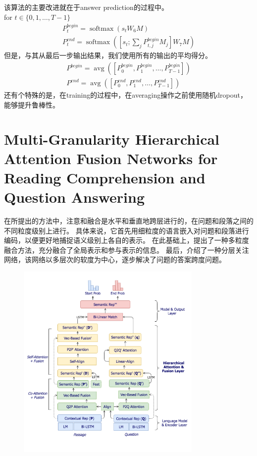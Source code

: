 \documentclass[a4paper,UTF8]{article}
\numberwithin{equation}{section}
\begin{document}
该算法的主要改进就在于answer prediction的过程中。\\
for $t \in\{0,1, \ldots, T-1\}$ \\
\begin{equation}
\begin{array}{c}{P_{t}^{b e g i n}=\operatorname{softmax}\left(s_{t} W_{6} M\right)} \\ {P_{t}^{e n d}=\operatorname{softmax}\left(\left[s_{t} ; \sum_{j} P_{t, j}^{b e g i n} M_{j}\right] W_{7} M\right)}\end{array}
\end{equation}
但是，与其从最后一步输出结果，我们使用所有的输出的平均得分。
\begin{equation}
\begin{array}{c}{P^{b e g i n}=\operatorname{avg}\left(\left[P_{0}^{b e g i n}, P_{1}^{b e g i n}, \ldots, P_{T-1}^{b e g i n}\right]\right)} \\ {P^{e n d}=\operatorname{avg}\left(\left[P_{0}^{e n d}, P_{1}^{e n d}, \ldots, P_{T-1}^{e n d}\right]\right)}\end{array}
\end{equation}
还有个特殊的是，在training的过程中，在averaging操作之前使用随机dropout，能够提升鲁棒性。 
\newpage
\section{Multi-Granularity Hierarchical Attention Fusion Networks for Reading Comprehension and Question Answering}
在所提出的方法中，注意和融合是水平和垂直地跨层进行的，在问题和段落之间的不同粒度级别上进行。
具体来说，它首先用细粒度的语言嵌入对问题和段落进行编码，以便更好地捕捉语义级别上各自的表示。
在此基础上，提出了一种多粒度融合方法，充分融合了全局表示和参与表示的信息。
最后，介绍了一种分层关注网络，该网络以多层次的软度为中心，逐步解决了问题的答案跨度问题。
\begin{figure}[H]
	\centering
	\includegraphics[width=0.8\textwidth]{2-1.png}
\end{figure}
\end{document}
